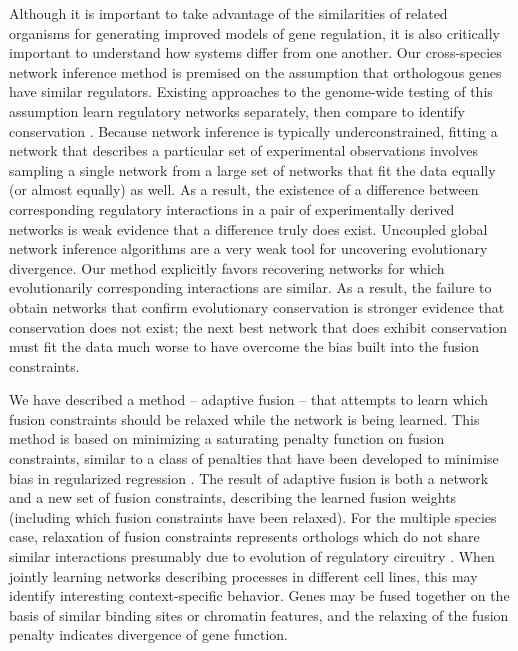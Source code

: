 \documentclass[11pt]{article}
\begin{document}
Although it is important to take advantage of the similarities of related organisms for generating improved models of gene regulation, it is also critically important to understand how systems differ from one another. 
Our cross-species network inference method is premised on the assumption that orthologous genes have similar regulators. 
Existing approaches to the genome-wide testing of this assumption learn regulatory networks separately, then compare to identify conservation \cite{aytes_cross-species_2014, Wang2014a}. 
Because network inference is typically underconstrained, fitting a network that describes a particular set of experimental observations involves sampling a single network from a large set of networks that fit the data equally (or almost equally) as well. As a result, the existence of a difference between corresponding regulatory interactions in a pair of experimentally derived networks is weak evidence that a difference truly does exist. 
Uncoupled global network inference algorithms are a very weak tool for uncovering evolutionary divergence. 
Our method explicitly favors recovering networks for which evolutionarily corresponding interactions are similar. 
As a result, the failure to obtain networks that confirm evolutionary conservation is stronger evidence that conservation does not exist; the next best network that does exhibit conservation must fit the data much worse to have overcome the bias built into the fusion constraints. 

We have described a method -- adaptive fusion -- that attempts to learn which fusion constraints should be relaxed while the network is being learned. 
This method is based on minimizing a saturating penalty function on fusion constraints, similar to a class of penalties that have been developed to minimise bias in regularized regression \cite{fan2001variable,zhang2010nearly}. 
The result of adaptive fusion is both a network and a new set of fusion constraints, describing the learned fusion weights (including which fusion constraints have been relaxed). 
For the multiple species case, relaxation of fusion constraints represents orthologs which do not share similar interactions presumably due to evolution of regulatory circuitry \cite{kellis_proof_2004}. %
When jointly learning networks describing processes in different cell lines, this may identify interesting context-specific behavior. 
Genes may be fused together on the basis of similar binding sites or chromatin features, and the relaxing of the fusion penalty indicates divergence of gene function. 
\end{document}
